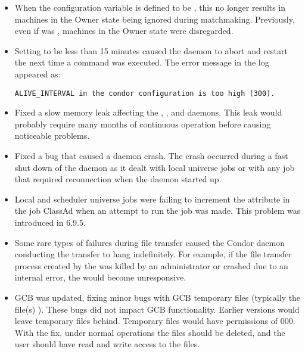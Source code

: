 \begin{itemize}
\item When the configuration variable 
is defined to be ,
this no longer results in machines in the Owner state being ignored
during matchmaking.  Previously, even if  was ,
machines in the Owner state were disregarded.

\item Setting  to be less than 15 minutes caused the
 daemon to abort and restart the next time a
 command was executed.
The error message in the  log appeared as:

\footnotesize
\begin{verbatim}
ALIVE_INTERVAL in the condor configuration is too high (300).
\end{verbatim}
\normalsize

\item Fixed a slow memory leak affecting the ,
, and  daemons.  This leak would probably
require many months of continuous operation before causing noticeable problems.

\item Fixed a bug that caused a  daemon crash.
The crash occurred during a fast shut down of the
 daemon as it dealt with local universe
jobs or with any job that required reconnection when
the  daemon started up.

\item Local and scheduler universe jobs were failing to increment the
 attribute in the job ClassAd when an attempt to run
the job was made.  This problem was introduced in 6.9.5.

\item Some rare types of failures during file transfer caused the
Condor daemon conducting the transfer to hang indefinitely.  For
example, if the file transfer process created by the 
was killed by an administrator or crashed due to an internal error,
the  would become unresponsive.

\item GCB was updated, fixing minor bugs with GCB temporary files 
(typically the file(s) ).
These bugs did not impact GCB functionality.  Earlier
versions would leave temporary files behind. Temporary files would have
permissions of 000.  With the fix, under normal operations the files should be
deleted, and the  user should have read and write access to the files.


\end{itemize}
